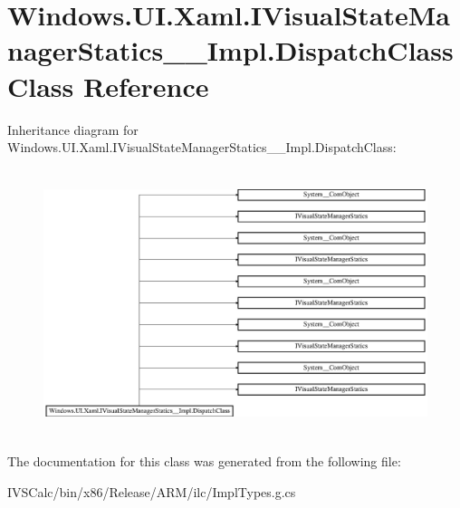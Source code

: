 \hypertarget{class_windows_1_1_u_i_1_1_xaml_1_1_i_visual_state_manager_statics_____impl_1_1_dispatch_class}{}\section{Windows.\+U\+I.\+Xaml.\+I\+Visual\+State\+Manager\+Statics\+\_\+\+\_\+\+Impl.\+Dispatch\+Class Class Reference}
\label{class_windows_1_1_u_i_1_1_xaml_1_1_i_visual_state_manager_statics_____impl_1_1_dispatch_class}
Inheritance diagram for Windows.\+U\+I.\+Xaml.\+I\+Visual\+State\+Manager\+Statics\+\_\+\+\_\+\+Impl.\+Dispatch\+Class\+:\begin{figure}[H]
\begin{center}
\leavevmode
\includegraphics[height=7.797468cm]{class_windows_1_1_u_i_1_1_xaml_1_1_i_visual_state_manager_statics_____impl_1_1_dispatch_class}
\end{center}
\end{figure}


The documentation for this class was generated from the following file\+:\begin{DoxyCompactItemize}
\item 
I\+V\+S\+Calc/bin/x86/\+Release/\+A\+R\+M/ilc/Impl\+Types.\+g.\+cs\end{DoxyCompactItemize}
